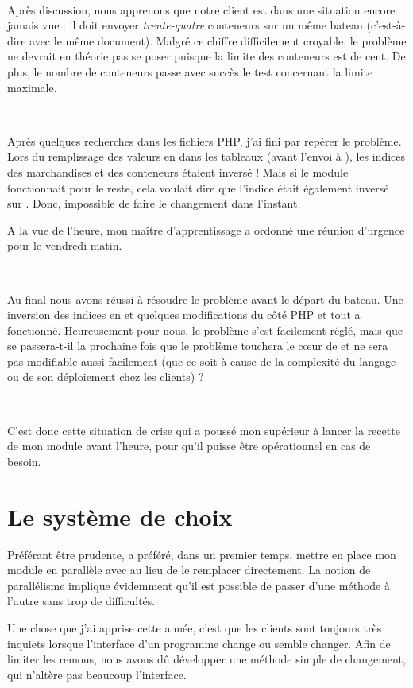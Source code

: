~

Après discussion, nous apprenons que notre client est dans une situation encore jamais vue : il doit envoyer \emph{trente-quatre} conteneurs sur un même bateau (c'est-à-dire avec le même document). Malgré ce chiffre difficilement croyable, le problème ne devrait en théorie pas se poser puisque la limite des conteneurs est de cent. De plus, le nombre de conteneurs passe avec succès le test concernant la limite maximale.

~

Après quelques recherches dans les fichiers PHP, j'ai fini par repérer le problème. Lors du remplissage des valeurs en \vb{} dans les tableaux (avant l'envoi à \pireus), les indices des marchandises et des conteneurs étaient inversé ! Mais si le module fonctionnait pour le reste, cela voulait dire que l'indice était également inversé sur \pireus. Donc, impossible de faire le changement dans l'instant.

A la vue de l'heure, mon maître d'apprentissage a ordonné une réunion d'urgence pour le vendredi matin.

~

Au final nous avons réussi à résoudre le problème avant le départ du bateau. Une inversion des indices en \vb{} et quelques modifications du côté PHP et tout a fonctionné. Heureusement pour nous, le problème s'est facilement réglé, mais que se passera-t-il la prochaine fois que le problème touchera le c\oe{ur} de \pireus{} et ne sera pas  modifiable aussi facilement (que ce soit à cause de la complexité du langage ou de son déploiement chez les clients) ?

~

C'est donc cette situation de crise qui a poussé mon supérieur à lancer la recette de mon module avant l'heure, pour qu'il puisse être opérationnel en cas de besoin.


\section{Le système de choix}
Préférant être prudente, \solulog{} a préféré, dans un premier temps, mettre en place mon module en parallèle avec \pireus{} au lieu de le remplacer directement. La notion de parallélisme implique évidemment qu'il est possible de passer d'une méthode à l'autre sans trop de difficultés.

Une chose que j'ai apprise cette année, c'est que les clients sont toujours très inquiets lorsque l'interface d'un programme change ou semble changer. Afin de limiter les remous, nous avons dû développer une méthode simple de changement, qui n'altère pas beaucoup l'interface.

